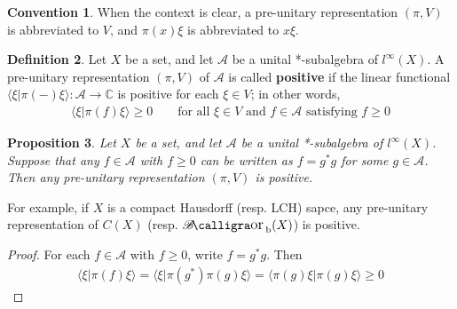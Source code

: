 \documentclass[12pt,b5paper,notitlepage]{article}
\theoremstyle{definition}
\newtheorem{df}{Definition}[subsection]
\newtheorem{cv}[df]{Convention}
\theoremstyle{plain}
\newtheorem{pp}[df]{Proposition}
\DeclareMathOperator{\Borb}{{\mathscr{B}\text{\kern -2pt {\calligra\large or}}\,}_{\mathrm b}}
\newcommand{\fk}{\mathfrak}
\newcommand{\bk}[1]{\langle {#1}\rangle}
\newcommand{\scr}{\mathscr}
\newcommand{\Cbb}{\mathbb C}
\numberwithin{equation}{section}
\begin{document}


\begin{cv}
When the context is clear, a pre-unitary representation $(\pi,V)$ is abbreviated to $V$, and $\pi(x)\xi$ is abbreviated to $x\xi$.
\end{cv}


\begin{df}
Let $X$ be a set, and let $\scr A$ be a unital *-subalgebra of $l^\infty(X)$. A pre-unitary representation $(\pi,V)$ of $\scr A$ is called \textbf{positive}  if the linear functional $\bk{\xi|\pi(-)\xi}:\scr A\rightarrow\Cbb$ is positive for each $\xi\in V$; in other words,
\begin{align}
\bk{\xi|\pi(f)\xi}\geq0\qquad\text{for all }\xi\in V\text{ and }f\in\scr A\text{ satisfying }f\geq0
\end{align}
\end{df}

\begin{pp}\label{lb272}
Let $X$ be a set, and let $\scr A$ be a unital *-subalgebra of  $l^\infty(X)$. Suppose that any $f\in\scr A$ with $f\geq0$ can be written as $f=g^*g$ for some $g\in\scr A$. Then any pre-unitary representation $(\pi,V)$ is positive.
\end{pp}

For example, if $X$ is a compact Hausdorff (resp. LCH) sapce, any pre-unitary representation of $C(X)$ (resp. $\Borb(X)$) is positive.

\begin{proof}
For each $f\in\scr A$ with $f\geq0$, write $f=g^*g$. Then
\begin{align*}
\bk{\xi|\pi(f)\xi}=\bk{\xi|\pi(g^*)\pi(g)\xi}=\bk{\pi(g)\xi|\pi(g)\xi}\geq0
\end{align*}
\end{proof}
\end{document}
